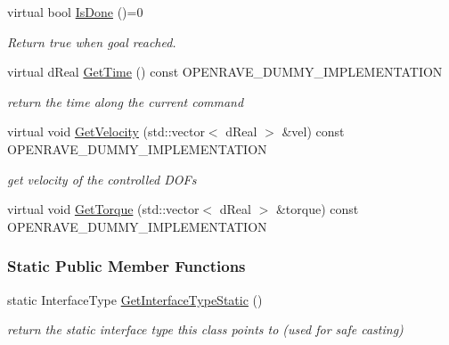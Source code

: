 \begin{DoxyCompactItemize}
virtual bool \hyperlink{classOpenRAVE_1_1ControllerBase_a2a9a4df35568126aca5e305ca35d1d31}{IsDone} ()=0
\begin{DoxyCompactList}\small\item\em Return true when goal reached. \item\end{DoxyCompactList}\item 
\hypertarget{classOpenRAVE_1_1ControllerBase_a80ec605da12db741e7c3e518af07e6d5}{
virtual dReal \hyperlink{classOpenRAVE_1_1ControllerBase_a80ec605da12db741e7c3e518af07e6d5}{GetTime} () const OPENRAVE\_\-DUMMY\_\-IMPLEMENTATION}
\label{classOpenRAVE_1_1ControllerBase_a80ec605da12db741e7c3e518af07e6d5}

\begin{DoxyCompactList}\small\item\em return the time along the current command \item\end{DoxyCompactList}\item 
virtual void \hyperlink{classOpenRAVE_1_1ControllerBase_aa7df84105fae386c84139ce5c5b7f1f1}{GetVelocity} (std::vector$<$ dReal $>$ \&vel) const OPENRAVE\_\-DUMMY\_\-IMPLEMENTATION
\begin{DoxyCompactList}\small\item\em get velocity of the controlled DOFs \item\end{DoxyCompactList}\item 
virtual void \hyperlink{classOpenRAVE_1_1ControllerBase_a5850b39ddc68841ef2961c2eb7bf7b8f}{GetTorque} (std::vector$<$ dReal $>$ \&torque) const OPENRAVE\_\-DUMMY\_\-IMPLEMENTATION
\end{DoxyCompactItemize}
\subsubsection*{Static Public Member Functions}
\begin{DoxyCompactItemize}
\item 
\hypertarget{classOpenRAVE_1_1ControllerBase_affeafe65e7c4094f282d273dedbf069b}{
static InterfaceType \hyperlink{classOpenRAVE_1_1ControllerBase_affeafe65e7c4094f282d273dedbf069b}{GetInterfaceTypeStatic} ()}
\label{classOpenRAVE_1_1ControllerBase_affeafe65e7c4094f282d273dedbf069b}

\begin{DoxyCompactList}\small\item\em return the static interface type this class points to (used for safe casting) \item\end{DoxyCompactList}\end{DoxyCompactItemize}


